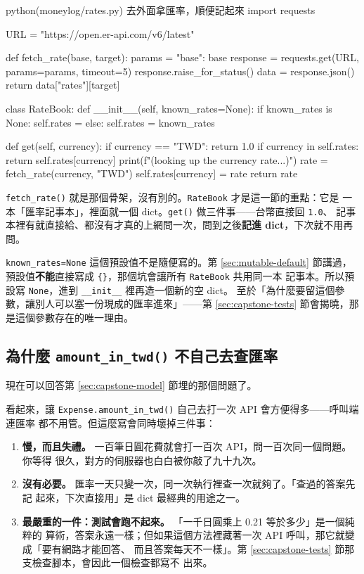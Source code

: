 \begin{example}{python}{(moneylog/rates.py) 去外面拿匯率，順便記起來}
import requests

URL = "https://open.er-api.com/v6/latest"


def fetch_rate(base, target):
    params = {"base": base}
    response = requests.get(URL, params=params, timeout=5)
    response.raise_for_status()
    data = response.json()
    return data["rates"][target]


class RateBook:
    def __init__(self, known_rates=None):
        if known_rates is None:
            self.rates = {}
        else:
            self.rates = known_rates

    def get(self, currency):
        if currency == "TWD":
            return 1.0
        if currency in self.rates:
            return self.rates[currency]
        print(f"(looking up the {currency} rate...)")
        rate = fetch_rate(currency, "TWD")
        self.rates[currency] = rate
        return rate
\end{example}

\texttt{fetch\_rate()} 就是那個骨架，沒有別的。\texttt{RateBook} 才是這一節的重點：它是
一本「匯率記事本」，裡面就一個 dict。\texttt{get()} 做三件事——台幣直接回 \texttt{1.0}、
記事本裡有就直接給、都沒有才真的上網問一次，問到之後\textbf{記進 dict}，下次就不用再問。

\texttt{known\_rates=None} 這個預設值不是隨便寫的。第 \ref{sec:mutable-default} 節講過，
預設值\textbf{不能}直接寫成 \texttt{\{\}}，那個坑會讓所有 \texttt{RateBook} 共用同一本
記事本。所以預設寫 \texttt{None}，進到 \texttt{\_\_init\_\_} 裡再造一個新的空 dict。
至於「為什麼要留這個參數，讓別人可以塞一份現成的匯率進來」——第 \ref{sec:capstone-tests}
節會揭曉，那是這個參數存在的唯一理由。

\subsection*{為什麼 \texttt{amount\_in\_twd()} 不自己去查匯率}

現在可以回答第 \ref{sec:capstone-model} 節埋的那個問題了。

看起來，讓 \texttt{Expense.amount\_in\_twd()} 自己去打一次 API 會方便得多——呼叫端連匯率
都不用管。但這麼寫會同時壞掉三件事：

\begin{enumerate}
\item \textbf{慢，而且失禮。} 一百筆日圓花費就會打一百次 API，問一百次同一個問題。你等得
很久，對方的伺服器也白白被你敲了九十九次。
\item \textbf{沒有必要。} 匯率一天只變一次，同一次執行裡查一次就夠了。「查過的答案先記
起來，下次直接用」是 dict 最經典的用途之一。
\item \textbf{最嚴重的一件：測試會跑不起來。} 「一千日圓乘上 0.21 等於多少」是一個純粹的
算術，答案永遠一樣；但如果這個方法裡藏著一次 API 呼叫，那它就變成「要有網路才能回答、
而且答案每天不一樣」。第 \ref{sec:capstone-tests} 節那支檢查腳本，會因此一個檢查都寫不
出來。
\end{enumerate}

